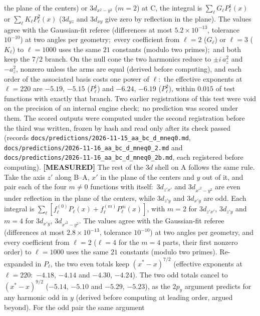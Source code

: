 \documentclass[aps,pra,twocolumn,superscriptaddress,longbibliography]{revtex4-2}
\begin{document}
the plane of the centers) or $3d_{x^2-y^2}$ ($m=2$) at C, the integral is
$\sum_\ell G_\ell P_\ell^{1}(x)$ or $\sum_\ell K_\ell P_\ell^{2}(x)$ ($3d_{yz}$ and $3d_{xy}$ give zero
by reflection in the plane).  The values agree with the Gaussian-fit referee (differences at most
$5.2\times10^{-13}$, tolerance $10^{-10}$) at two angles per geometry;\ every coefficient from
$\ell=2$ ($G_\ell$) or $\ell=3$ ($K_\ell$) to $\ell=1000$ uses the same $21$ constants (modulo two
primes);\ and both keep the $7/2$ branch.  On the null cone the two harmonics reduce to $\pm i\,a_z^{2}$
and $-a_z^{2}$, nonzero unless the arms are equal (derived before computing), and each order of the
associated basis costs one power of $\ell$:\ the effective exponents at $\ell=220$ are $-5.19$, $-5.15$
($P_\ell^{1}$) and $-6.24$, $-6.19$ ($P_\ell^{2}$), within $0.015$ of test functions with exactly that
branch.  Two earlier registrations of this test were void on the precision of an internal engine
check;\ no prediction was scored under them.  The scored outputs were computed under the second
registration before the third was written, frozen by hash and read only after its check passed (records
\texttt{docs/predictions/2026-11-15\_aa\_bc\_d\_mneq0.md},
\texttt{docs/predictions/2026-11-16\_aa\_bc\_d\_mneq0\_2.md} and
\texttt{docs/predictions/2026-11-16\_aa\_bc\_d\_mneq0\_2b.md}, each registered before computing).
\textbf{[MEASURED]} The rest of the $3d$ shell on A follows the same rule.  Take the axis $z'$ along
B--A, $x'$ in the plane of the centers and $y$ out of it, and pair each of the four $m\neq0$
functions with itself:\ $3d_{z'x'}$ and $3d_{x'^2-y^2}$ are even under reflection in the plane
of the centers, while $3d_{z'y}$ and $3d_{x'y}$ are odd.  Each integral is
$\sum_\ell[f^{(0)}_\ell P_\ell(x)+f^{(m)}_\ell P_\ell^{m}(x)]$, with $m=2$ for $3d_{z'x'}$, $3d_{z'y}$ and
$m=4$ for $3d_{x'y}$, $3d_{x'^2-y^2}$.  The values agree with the Gaussian-fit referee (differences at
most $2.8\times10^{-13}$, tolerance $10^{-10}$) at two angles per geometry, and every coefficient
from $\ell=2$ ($\ell=4$ for the $m=4$ parts, their first nonzero order) to $\ell=1000$ uses the same
$21$ constants (modulo two primes).  Re-expanded in
$P_\ell$, the two even totals keep $(x^{*}-x)^{7/2}$ (effective exponents at $\ell=220$:\ $-4.18$,
$-4.14$ and $-4.30$, $-4.24$).  The two odd totals cancel to $(x^{*}-x)^{9/2}$ ($-5.14$,
$-5.10$ and $-5.29$, $-5.23$), as the $2p_y$ argument predicts for any harmonic odd in $y$
(derived before computing at leading order, argued beyond).  For the odd pair the same argument
\end{document}

